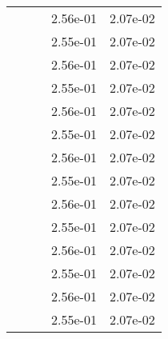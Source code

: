 \begin{table}
\begin{tabular}{c|cc|cc|}
\multicolumn{1}{|c|}{} & \multicolumn{1}{|c|}{} & \multicolumn{1}{|c|}{} & \multicolumn{1}{|c|}{  2.56e-01} & \multicolumn{1}{|c|}{  2.07e-02} \\ 
\multicolumn{1}{|c|}{} & \multicolumn{1}{|c|}{} & \multicolumn{1}{|c|}{} & \multicolumn{1}{|c|}{  2.55e-01} & \multicolumn{1}{|c|}{  2.07e-02} \\ 
\multicolumn{1}{|c|}{} & \multicolumn{1}{|c|}{} & \multicolumn{1}{|c|}{} & \multicolumn{1}{|c|}{  2.56e-01} & \multicolumn{1}{|c|}{  2.07e-02} \\ 
\multicolumn{1}{|c|}{} & \multicolumn{1}{|c|}{} & \multicolumn{1}{|c|}{} & \multicolumn{1}{|c|}{  2.55e-01} & \multicolumn{1}{|c|}{  2.07e-02} \\ 
\multicolumn{1}{|c|}{} & \multicolumn{1}{|c|}{} & \multicolumn{1}{|c|}{} & \multicolumn{1}{|c|}{  2.56e-01} & \multicolumn{1}{|c|}{  2.07e-02} \\ 
\multicolumn{1}{|c|}{} & \multicolumn{1}{|c|}{} & \multicolumn{1}{|c|}{} & \multicolumn{1}{|c|}{  2.55e-01} & \multicolumn{1}{|c|}{  2.07e-02} \\ 
\multicolumn{1}{|c|}{} & \multicolumn{1}{|c|}{} & \multicolumn{1}{|c|}{} & \multicolumn{1}{|c|}{  2.56e-01} & \multicolumn{1}{|c|}{  2.07e-02} \\ 
\multicolumn{1}{|c|}{} & \multicolumn{1}{|c|}{} & \multicolumn{1}{|c|}{} & \multicolumn{1}{|c|}{  2.55e-01} & \multicolumn{1}{|c|}{  2.07e-02} \\ 
\multicolumn{1}{|c|}{} & \multicolumn{1}{|c|}{} & \multicolumn{1}{|c|}{} & \multicolumn{1}{|c|}{  2.56e-01} & \multicolumn{1}{|c|}{  2.07e-02} \\ 
\multicolumn{1}{|c|}{} & \multicolumn{1}{|c|}{} & \multicolumn{1}{|c|}{} & \multicolumn{1}{|c|}{  2.55e-01} & \multicolumn{1}{|c|}{  2.07e-02} \\ 
\multicolumn{1}{|c|}{} & \multicolumn{1}{|c|}{} & \multicolumn{1}{|c|}{} & \multicolumn{1}{|c|}{  2.56e-01} & \multicolumn{1}{|c|}{  2.07e-02} \\ 
\multicolumn{1}{|c|}{} & \multicolumn{1}{|c|}{} & \multicolumn{1}{|c|}{} & \multicolumn{1}{|c|}{  2.55e-01} & \multicolumn{1}{|c|}{  2.07e-02} \\ 
\multicolumn{1}{|c|}{} & \multicolumn{1}{|c|}{} & \multicolumn{1}{|c|}{} & \multicolumn{1}{|c|}{  2.56e-01} & \multicolumn{1}{|c|}{  2.07e-02} \\ 
\multicolumn{1}{|c|}{} & \multicolumn{1}{|c|}{} & \multicolumn{1}{|c|}{} & \multicolumn{1}{|c|}{  2.55e-01} & \multicolumn{1}{|c|}{  2.07e-02} \\ 

\end{tabular}
\end{table}
